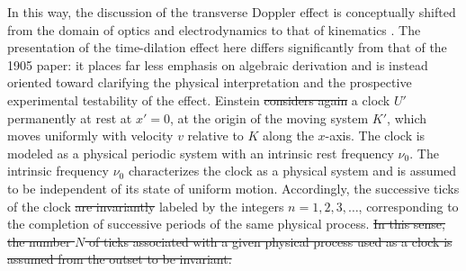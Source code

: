 \documentclass[submitted,12pt]{article} %
\providecommand{\DIFadd}[1]{{\protect\color{blue}\uwave{#1}}} %
\providecommand{\DIFdel}[1]{{\protect\color{red}\sout{#1}}}                      %
\providecommand{\DIFaddbegin}{} %
\providecommand{\DIFaddend}{} %
\providecommand{\DIFdelbegin}{} %
\providecommand{\DIFdelend}{} %
\begin{document}
In this way, the discussion of the transverse Doppler effect is conceptually shifted from the domain of optics and electrodynamics to that of kinematics \citep[421\psq]{Einstein1908}. The presentation of the time-dilation effect here differs significantly from that of the 1905 paper: it places far less emphasis on algebraic derivation and is instead oriented toward clarifying the physical interpretation and the prospective experimental testability of the effect. Einstein \DIFdelbegin \DIFdel{considers again }\DIFdelend \DIFaddbegin \DIFadd{again considers }\DIFaddend a clock $U'$ permanently at rest at $x'=0$, at the origin of the moving system $K'$, which moves uniformly with velocity $v$ relative to $K$ along the $x$-axis. The clock is modeled as a physical periodic system with an intrinsic rest frequency $\nu_0$. The intrinsic frequency $\nu_0$ characterizes the clock as a physical system and is assumed to be independent of its state of uniform motion. Accordingly, the successive ticks of the clock \DIFdelbegin \DIFdel{are invariantly }\DIFdelend \DIFaddbegin \DIFadd{can be }\DIFaddend labeled by the integers $n=1,2,3,\ldots$, corresponding to the completion of successive periods of the same physical process.
\DIFdelbegin \DIFdel{In this sense, the number $N$ of ticks associated with a given physical process used as a clock is assumed from the outset to be invariant.
}\DIFdelend 
\end{document}
